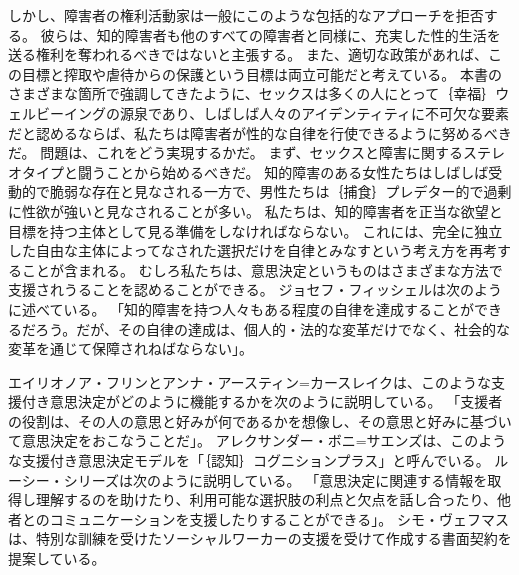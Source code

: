 \documentclass[paper=a4,book,openany]{jlreq}
\begin{document}
しかし、障害者の権利活動家は一般にこのような包括的なアプローチを拒否する。
彼らは、知的障害者も他のすべての障害者と同様に、充実した性的生活を送る権利を奪われるべきではないと主張する。
また、適切な政策があれば、この目標と搾取や虐待からの保護という目標は両立可能だと考えている。
本書のさまざまな箇所で強調してきたように、セックスは多くの人にとって｛幸福｝{ウェルビーイング}の源泉であり、しばしば人々のアイデンティティに不可欠な要素だと認めるならば、私たちは障害者が性的な自律を行使できるように努めるべきだ\citep{vehmas19:_person_profoun_intel_disab_their_right_sex,hollomotz10:_vulner_adult,evans09:_sexual_person_relat_peopl_intel_disab,kittay10:_person_is_philos_is_polit}。
問題は、これをどう実現するかだ。
まず、セックスと障害に関するステレオタイプと闘うことから始めるべきだ。
知的障害のある女性たちはしばしば受動的で脆弱な存在と見なされる一方で、男性たちは｛捕食｝{プレデター}的で過剰に性欲が強いと見なされることが多い\citep{feely16:_sexual_surveil_contr_commun_based,gill15:_alread_doing_it,barrett14:_disab_mascul}。
私たちは、知的障害者を正当な欲望と目標を持つ主体として見る準備をしなければならない。
これには、完全に独立した自由な主体によってなされた選択だけを自律とみなすという考え方を再考することが含まれる。
むしろ私たちは、意思決定というものはさまざまな方法で支援されうることを認めることができる。
ジョセフ・フィッシェルは次のように述べている。
「知的障害を持つ人々もある程度の自律を達成することができるだろう。だが、その自律の達成は、個人的・法的な変革だけでなく、社会的な変革を通じて保障されねばならない」\citep[p.146]{fischel18:screwconsent}。

エイリオノア・フリンとアンナ・アースティン=カースレイクは、このような支援付き意思決定がどのように機能するかを次のように説明している。
「支援者の役割は、その人の意思と好みが何であるかを想像し、その意思と好みに基づいて意思決定をおこなうことだ」\citep[pp.81--104]{flynn14:_legis_person}。
アレクサンダー・ボニ=サエンズは、このような支援付き意思決定モデルを「｛認知｝{コグニション}プラス」と呼んでいる\citep[p.1234]{boni-saenz15:_sexual_incap}。
ルーシー・シリーズは次のように説明している。
「意思決定に関連する情報を取得し理解するのを助けたり、利用可能な選択肢の利点と欠点を話し合ったり、他者とのコミュニケーションを支援したりすることができる」\citep{series15:_relat_auton_legal_capac}。
シモ・ヴェフマスは、特別な訓練を受けたソーシャルワーカーの支援を受けて作成する書面契約を提案している\citep[p.527]{vehmas19:_person_profoun_intel_disab_their_right_sex}。
\end{document}
